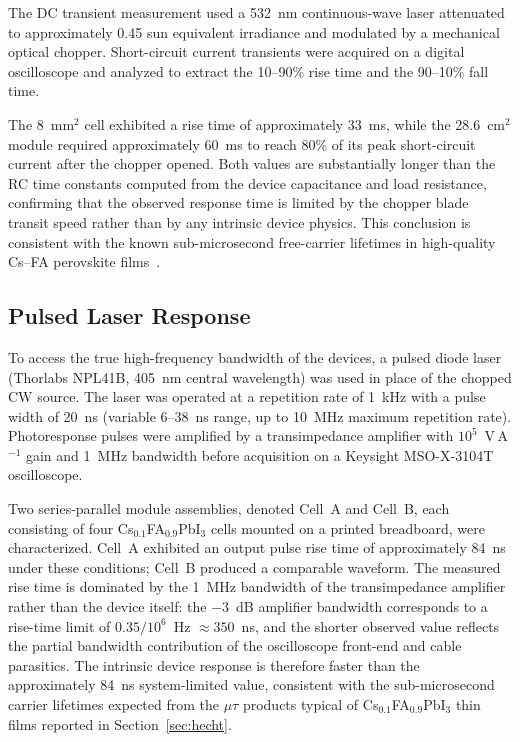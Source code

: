 The DC transient measurement used a 532~nm continuous-wave laser
attenuated to approximately 0.45 sun equivalent irradiance and modulated
by a mechanical optical chopper.  Short-circuit current transients were
acquired on a digital oscilloscope and analyzed to extract the 10--90\%
rise time and the 90--10\% fall time.

The 8~mm$^2$ cell exhibited a rise time of approximately 33~ms, while
the 28.6~cm$^2$ module required approximately 60~ms to reach 80\% of its
peak short-circuit current after the chopper opened.  Both values are
substantially longer than the RC time constants computed from the
device capacitance and load resistance, confirming that the observed
response time is limited by the chopper blade transit speed rather
than by any intrinsic device physics.  This conclusion is consistent
with the known sub-microsecond free-carrier lifetimes in high-quality
Cs--FA perovskite films~\cite{Guerrero2021chemrev}.

\subsection{Pulsed Laser Response}
\label{sec:pulsed_laser}

To access the true high-frequency bandwidth of the devices, a pulsed
diode laser (Thorlabs NPL41B, 405~nm central wavelength) was used in
place of the chopped CW source.  The laser was operated at a
repetition rate of 1~kHz with a pulse width of 20~ns (variable
6--38~ns range, up to 10~MHz maximum repetition rate).
Photoresponse pulses were amplified by a transimpedance amplifier
with $10^5$~V\,A$^{-1}$ gain and 1~MHz bandwidth before acquisition
on a Keysight MSO-X-3104T oscilloscope.

Two series-parallel module assemblies, denoted Cell~A and Cell~B,
each consisting of four Cs$_{0.1}$FA$_{0.9}$PbI$_3$ cells mounted on
a printed breadboard, were characterized.  Cell~A exhibited an output
pulse rise time of approximately 84~ns under these conditions; Cell~B
produced a comparable waveform.  The measured rise time is dominated
by the 1~MHz bandwidth of the transimpedance amplifier rather than
the device itself: the $-3$~dB amplifier bandwidth corresponds to a
rise-time limit of $0.35 / 10^6$~Hz $\approx 350$~ns, and the
shorter observed value reflects the partial bandwidth contribution of
the oscilloscope front-end and cable parasitics.  The intrinsic
device response is therefore faster than the approximately 84~ns
system-limited value, consistent with the sub-microsecond carrier
lifetimes expected from the $\mu\tau$ products typical of
Cs$_{0.1}$FA$_{0.9}$PbI$_3$ thin films reported in
Section~\ref{sec:hecht}.

